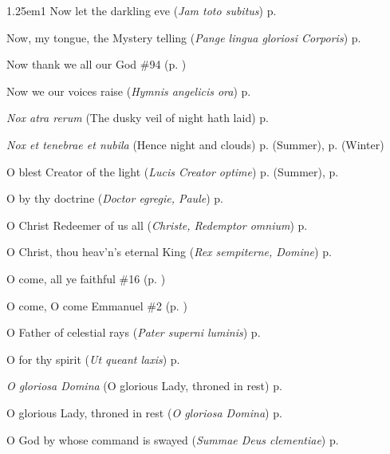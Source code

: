 \begin{hangparas}{1.25em}{1}
Now let the darkling eve (\textit{Jam toto subitus}) \dotfill p. \pageref{SevenSorrowsEvensong}
\par\noindent
Now, my tongue, the Mystery telling (\textit{Pange lingua gloriosi Corporis}) \dotfill p. \pageref{CorpusChristiEvensong}
\par\noindent
Now thank we all our God \dotfill \#94 (p. \pageref{Hymn94})
\par\noindent
Now we our voices raise (\textit{Hymnis angelicis ora}) \dotfill p. \pageref{ScholasticaInvitatory}
\par\noindent
\textit{Nox atra rerum} (The dusky veil of night hath laid) \dotfill p. \pageref{ThursdayInvitatory}
\par\noindent
\textit{Nox et tenebrae et nubila} (Hence night and clouds) \dotfill p. \pageref{WednesdayMattinsSummer} (Summer), p. \pageref{WednesdayMattinsWinter} (Winter)
\par\noindent
O blest Creator of the light (\textit{Lucis Creator optime}) \dotfill p. \pageref{SundayEvensongSummer} (Summer), p. \pageref{SundayEvensongWinter}
\par\noindent
O by thy doctrine (\textit{Doctor egregie, Paule}) \dotfill p. \pageref{PaulEvensong}
\par\noindent
O Christ Redeemer of us all (\textit{Christe, Redemptor omnium}) \dotfill p. \pageref{AllHallowsEvensong}
\par\noindent
O Christ, thou heav'n's eternal King (\textit{Rex sempiterne, Domine}) \dotfill p. \pageref{EasterDayInvitatory}
\par\noindent
O come, all ye faithful \dotfill \#16 (p. \pageref{Hymn16})
\par\noindent
O come, O come Emmanuel \dotfill \#2 (p. \pageref{Hymn2})
\par\noindent
O Father of celestial rays (\textit{Pater superni luminis}) \dotfill p. \pageref{MaryMagdaleneEvensong}
\par\noindent
O for thy spirit (\textit{Ut queant laxis}) \dotfill p. \pageref{JohnBaptistEvensong}
\par\noindent
\textit{O gloriosa Domina} (O glorious Lady, throned in rest) \dotfill p. \pageref{BVMMattins}
\par\noindent
O glorious Lady, throned in rest (\textit{O gloriosa Domina}) \dotfill p. \pageref{BVMMattins}
\par\noindent
O God by whose command is swayed (\textit{Summae Deus clementiae}) \dotfill p. \pageref{TrinityInvitatory}
\par\noindent

\end{hangparas}
